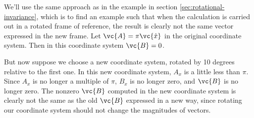 We'll use the same approach as in the example
in section \ref{sec:rotational-invariance}, which is to find an example
such that when the calculation is carried out in a rotated frame of reference,
the result is clearly not the same vector expressed in the new frame.
Let $\vc{A}=\pi\vc{\hat{x}}$ in the original coordinate system. Then
in this coordinate system $\vc{B}=0$. 

But now suppose we choose a new coordinate
system, rotated by 10 degrees relative to the first one. In this new coordinate
system, $A_x$ is a little less than $\pi$. Since $A_x$ is no longer a multiple of
$\pi$, $B_x$ is no longer zero, and $\vc{B}$ is no longer zero. The nonzero $\vc{B}$
computed in the new coordinate system is clearly not the same as the old $\vc{B}$
expressed in a new way, since rotating our coordinate system should not change the
magnitudes of vectors.



